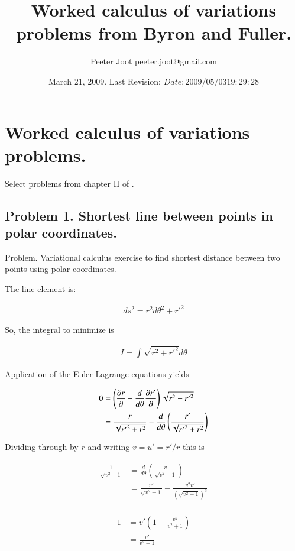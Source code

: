 \documentclass{article}
\title{ Worked calculus of variations problems from Byron and Fuller. }
\author{Peeter Joot \quad peeter.joot@gmail.com }
\date{ March 21, 2009.  Last Revision: $Date: 2009/05/03 19:29:28 $ }
\begin{document}
\maketitle{}
\tableofcontents

\section{ Worked calculus of variations problems. }

Select problems from chapter II of \cite{byron1992mca}.

\subsection{ Problem 1.  Shortest line between points in polar coordinates. }

Problem.  Variational calculus exercise to find shortest distance between two points using polar coordinates.
 
The line element is:
 
\begin{align*}
ds^2 = r^2 d\theta^2 + {r'}^2
\end{align*}
 
So, the integral to minimize is
 
\begin{align*}
I = \int \sqrt{ r^2 + {r'}^2 } d\theta
\end{align*}
 
Application of the Euler-Lagrange equations yields
 
\begin{align*}
0 
&= \left( \frac{\partial{r}}{\partial {}} - \frac{d}{d\theta} \frac{\partial{r'}}{\partial {}} \right) \sqrt{ r^2 + {r'}^2 }  \\
&= \frac{r}{\sqrt{{r'}^2 + r^2}} - \frac{d}{d\theta} \left( \frac{{r'}}{\sqrt{{r'}^2 + r^2}}\right) \\
\end{align*}
 
Dividing through by $r$ and writing $v = u' = {r'}/r$ this is
 
\begin{align*}
\frac{1}{\sqrt{v^2 + 1}}
&= \frac{d}{d\theta} \left( \frac{v}{\sqrt{v^2 + 1}}\right) \\
&= \frac{v'}{\sqrt{v^2 + 1}} -\frac{v^2 v'}{(\sqrt{v^2 + 1})^3} \\
\end{align*}
 
\begin{align*}
1 
&= v' \left( 1 -\frac{v^2 }{v^2 + 1} \right) \\
&= \frac{v'}{v^2 + 1} \\
\end{align*}
\end{document}
